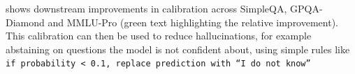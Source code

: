 
  shows downstream improvements in calibration across SimpleQA, GPQA-Diamond and MMLU-Pro (green text highlighting the relative improvement).
This calibration can then be used to reduce hallucinations, for example abstaining on questions the model is not confident about, using simple rules like \texttt{if probability < 0.1, replace prediction with ``I do not know''}\vspace{0.15cm}

